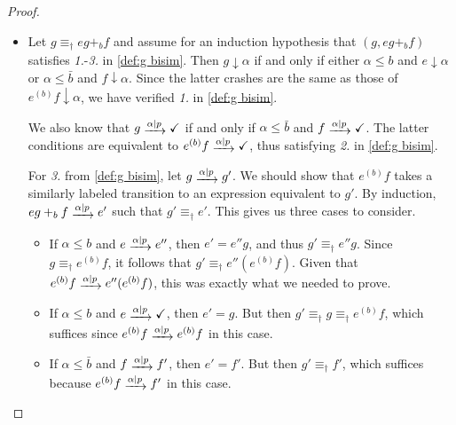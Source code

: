 \documentclass[orivec,envcountsect,envcountsame]{llncs}
\begin{document}
\begin{proof}
\begin{itemize}
\begin{itemize}
            If $\alpha \leq b$, then the transitions out of $g^{(b)}e_1$ and $g^{(b)}e_2$ must either both reject, or go to expressions again related by $\equiv_\dagger$.
            Otherwise, if $\alpha \leq b$, then the $\alpha$-transitions of $g^{(b)}e_1$ and $g^{(b)}e_2$ are determined by $e_1$ and $e_2$ respectively, which are equivalent by assumption; the claim then follows.
		\end{itemize}
		\item Let \(g \equiv_\dagger eg +_b f\) and assume for an induction hypothesis that \((g, eg +_b f)\) satisfies \emph{1.}-\emph{3.} in \cref{def:g bisim}.
		Then \(g \downarrow \alpha\) if and only if either \(\alpha \le b\) and \(e \downarrow \alpha\) or \(\alpha \le \bar b\) and \(f \downarrow \alpha\).
		Since the latter crashes are the same as those of \(e^{(b)}f \downarrow \alpha\), we have verified \emph{1.} in \cref{def:g bisim}.

		We also know that \(g \tr{\alpha \mid p} \checkmark\) if and only if \(\alpha \le \bar b\) and \(f \tr{\alpha \mid p} \checkmark\).
		The latter conditions are equivalent to \(e^{(b)}f \tr{\alpha \mid p} \checkmark\), thus satisfying \emph{2.} in \cref{def:g bisim}.

        For \emph{3.} from \cref{def:g bisim}, let \(g \tr{\alpha \mid p} g'\).
        We should show that \(e^{(b)}f\) takes a similarly labeled transition to an expression equivalent to \(g'\).
        By induction, \(eg +_b f \tr{\alpha \mid p} e'\) such that \(g' \equiv_\dagger e'\).
        This gives us three cases to consider.
		\begin{itemize}
			\item
            If \(\alpha \le b\) and \(e \tr{\alpha \mid p} e''\), then \(e' = e''g\), and thus \(g' \equiv_\dagger e'' g\).
            Since \(g \equiv_\dagger e^{(b)}f\), it follows that \(g' \equiv_\dagger e''(e^{(b)}f)\).
            Given that \(e^{(b)} f \tr{\alpha \mid p} e''(e^{(b)}f)\), this was exactly what we needed to prove.
			\item
            If \(\alpha \le b\) and \(e \tr{\alpha \mid p} \checkmark\), then \(e' = g\).
			But then \(g' \equiv_\dagger g \equiv_\dagger e^{(b)}f\), which suffices since \(e^{(b)}f \tr{\alpha \mid p} e^{(b)}f\) in this case.
			\item
            If \(\alpha \le \bar b\) and \(f \tr{\alpha \mid p} f'\), then \(e' = f'\).
            But then \(g' \equiv_\dagger f'\), which suffices because \(e^{(b)}f \tr{\alpha \mid p} f'\) in this case.
		\end{itemize}
	\end{itemize}


\end{proof}
\end{document}
